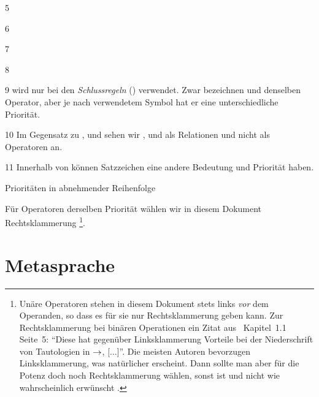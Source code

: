 \begin{table}[p]
\begin{center}
\begin{threeparttable}
\begin{tablenotes}
				\item[5] 
				\item[6] 
				\item[7] 
				\item[8] 
				\item[9] \symqt{\srand} wird nur bei den \emph{Schlussregeln} () verwendet.
				Zwar bezeichnen \symqt{\metaandsym} und \symqt{\srand} denselben Operator, aber je nach verwendetem Symbol hat er eine unterschiedliche Priorität.
				\item[10] Im Gegensatz zu \objqt{\lrep}, \objqt{\limp} und \objqt{\lequiv} sehen wir \objqt{\metarep}, \objqt{\metaimp} und \objqt{\metaequiv} als Relationen und nicht als Operatoren an.
				\item[11] Innerhalb von  können Satzzeichen eine andere Bedeutung und Priorität haben.
			\end{tablenotes}
		\end{threeparttable}
		\caption{Prioritäten in abnehmender Reihenfolge}
		\label{tab:Prioritäten}%
	\end{center}
\end{table}

Für Operatoren derselben Priorität wählen wir in diesem Dokument Rechtsklammerung%
\footnote{%
	Unäre Operatoren stehen in diesem Dokument stets links \emph{vor} dem Operanden, so dass es für sie nur Rechtsklammerung geben kann.
	Zur Rechtsklammerung bei binären Operationen ein Zitat aus~\cite{bib:Rautenberg} Kapitel~1.1 Seite~5:
	\enquote{Diese hat gegenüber Linksklammerung Vorteile bei der Niederschrift von Tautologien in $\rightarrow$, [...]}.
	Die meisten Autoren bevorzugen Linksklammerung, was natürlicher erscheint.
	Dann sollte man aber für die Potenz doch noch Rechtsklammerung wählen, sonst ist  und nicht wie wahrscheinlich erwünscht .
}.

\section{Metasprache}%
\label{sec:Metasprache}

